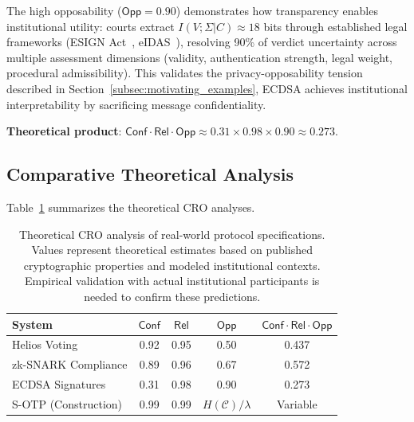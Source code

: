 \documentclass{ieeeaccess}
\begin{document}
The high opposability ($\mathsf{Opp} = 0.90$) demonstrates how transparency enables institutional utility: courts extract $I(V;\Sigma|C) \approx 18$ bits through established legal frameworks (ESIGN Act~\cite{ESIGN00}, eIDAS~\cite{eIDAS14}), resolving 90\% of verdict uncertainty across multiple assessment dimensions (validity, authentication strength, legal weight, procedural admissibility). This validates the privacy-opposability tension described in Section~\ref{subsec:motivating_examples}, ECDSA achieves institutional interpretability by sacrificing message confidentiality.

\textbf{Theoretical product}: $\mathsf{Conf} \cdot \mathsf{Rel} \cdot \mathsf{Opp} \approx 0.31 \times 0.98 \times 0.90 \approx 0.273$.

\subsection{Comparative Theoretical Analysis}

Table~\ref{tab:cri_comparison} summarizes the theoretical CRO analyses.

\begin{table}[h]
\centering
\begin{tabular}{lcccc}
\toprule
\textbf{System} & $\mathsf{Conf}$ & $\mathsf{Rel}$ & $\mathsf{Opp}$ & $\mathsf{Conf} \cdot \mathsf{Rel} \cdot \mathsf{Opp}$ \\
\midrule
Helios Voting & 0.92 & 0.95 & 0.50 & 0.437 \\
zk-SNARK Compliance & 0.89 & 0.96 & 0.67 & 0.572 \\
ECDSA Signatures & 0.31 & 0.98 & 0.90 & 0.273 \\
S-OTP (Construction) & 0.99 & 0.99 & $H(\mathcal{C})/\lambda$ & Variable \\
\bottomrule
\end{tabular}
\caption{Theoretical CRO analysis of real-world protocol specifications. Values represent theoretical estimates based on published cryptographic properties and modeled institutional contexts. Empirical validation with actual institutional participants is needed to confirm these predictions.}
\label{tab:cri_comparison}
\end{table}
\end{document}
